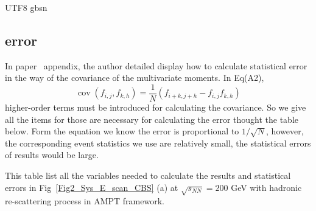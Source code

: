 \documentclass[twocolumn,showpacs,preprintnumbers,superscriptaddress,amsmath,amssymb]{revtex4}
\begin{document}
\begin{CJK*} {UTF8} {gbsn}
	
	  \begin{appendices} 
      \section{ error  } 
	 In paper~\cite{Luo_UrQMD} appendix, the author detailed display how to calculate statistical error in the way of the covariance of the multivariate moments.
	 In Eq(A2), 
	 \begin{equation}
\operatorname{cov}\left(f_{i, j}, f_{k, h}\right)=\frac{1}{N}\left(f_{i+k, j+h}-f_{i, j} f_{k, h}\right)
\end{equation}
higher-order terms must be introduced for calculating the covariance.
	 So we give all the items for those are necessary for calculating the error thought the table below. 
	 Form the equation we know the error is proportional to $1/\sqrt{N}$, however, the corresponding event statistics we use are relatively small, 
	 the statistical errors of results would be large.
	 	\begin{table*}[]
\scriptsize
\centering
\caption{This table list all the variables needed to calculate the results and statistical errors in Fig~\ref{Fig2_Sys_E_scan_CBS} (a) at $\sqrt{s_{NN}} = 200$ GeV with hadronic re-scattering process in AMPT framework.}
\label{error_info}


\end{table*}
\end{appendices}
\end{CJK*}
\end{document}
